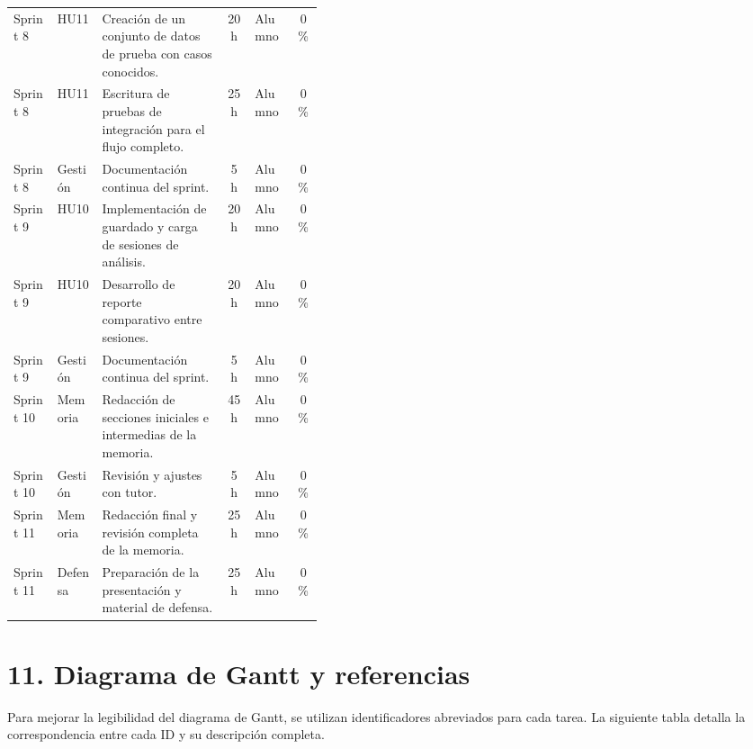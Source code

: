 \documentclass[
11pt, %
]{charter}
\begin{document}
\begin{longtable}{|l|l|p{0.4\linewidth}|c|l|c|}
Sprint 8 & HU11 & Creación de un conjunto de datos de prueba con casos conocidos. & 20 h & Alumno & 0\% \\
Sprint 8 & HU11 & Escritura de pruebas de integración para el flujo completo. & 25 h & Alumno & 0\% \\
Sprint 8 & Gestión & Documentación continua del sprint. & 5 h & Alumno & 0\% \\ \hline

Sprint 9 & HU10 & Implementación de guardado y carga de sesiones de análisis. & 20 h & Alumno & 0\% \\
Sprint 9 & HU10 & Desarrollo de reporte comparativo entre sesiones. & 20 h & Alumno & 0\% \\
Sprint 9 & Gestión & Documentación continua del sprint. & 5 h & Alumno & 0\% \\ \hline

Sprint 10 & Memoria & Redacción de secciones iniciales e intermedias de la memoria. & 45 h & Alumno & 0\% \\
Sprint 10 & Gestión & Revisión y ajustes con tutor. & 5 h & Alumno & 0\% \\ \hline

Sprint 11 & Memoria & Redacción final y revisión completa de la memoria. & 25 h & Alumno & 0\% \\
Sprint 11 & Defensa & Preparación de la presentación y material de defensa. & 25 h & Alumno & 0\% \\

\end{longtable}

\section{11. Diagrama de Gantt y referencias}
\label{sec:gantt_sprints}

Para mejorar la legibilidad del diagrama de Gantt, se utilizan identificadores abreviados para cada tarea. La siguiente tabla detalla la correspondencia entre cada ID y su descripción completa.
\end{document}
